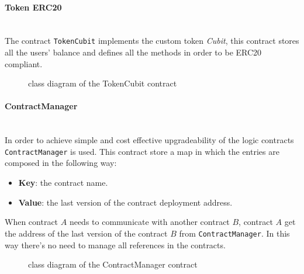 \paragraph{Token ERC20}\mbox{}\\

\noindent The contract \texttt{TokenCubit} implements the custom token \textit{Cubit}, this contract stores all the users' balance and defines all the methods in order to be ERC20 compliant.
\begin{figure}[H]
	\centering
	\caption{class diagram of the TokenCubit contract}
\end{figure}

\paragraph{ContractManager}\mbox{}\\ 

\noindent In order to achieve simple and cost effective upgradeability of the logic contracts \texttt{ContractManager} is used. This contract store a map in which the entries are composed in the following way:
\begin{itemize}
	\item\textbf{Key}: the contract name.
	\item\textbf{Value}: the last version of the contract deployment address.
\end{itemize}
When contract $A$ needs to communicate with another contract $B$, contract $A$ get the address of the last version of the contract $B$ from \texttt{ContractManager}. In this way there's no need to manage all references in the contracts. 
\begin{figure}[H]
	\centering
	\caption{class diagram of the ContractManager contract}
\end{figure}

